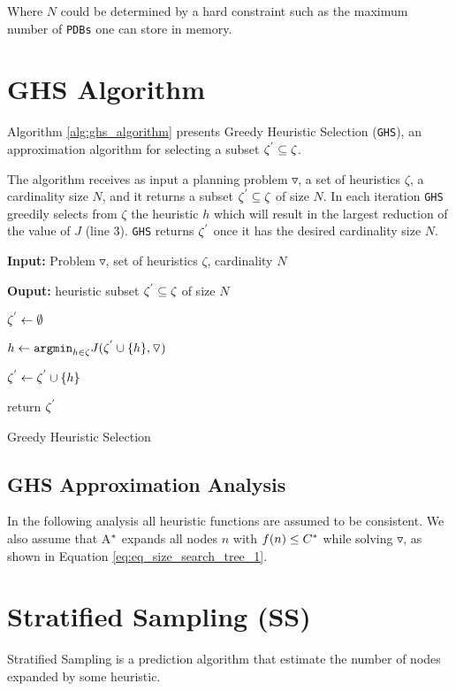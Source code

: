 Where $N$ could be determined by a hard constraint such as the maximum number of \texttt{PDBs} one can store in memory.

\section{GHS Algorithm}
\noindent
Algorithm \ref{alg:ghs_algorithm} presents Greedy Heuristic Selection (\texttt{GHS}), an approximation algorithm for selecting a subset $\zeta\sp{'} \subseteq \zeta$.

The algorithm receives as input a planning problem $\triangledown$, a set of heuristics $\zeta$, a cardinality size $N$, and it returns a subset $\zeta\sp{'} \subseteq \zeta$ of size $N$. In each iteration \texttt{GHS} greedily selects from $\zeta$ the heuristic $h$ which will result in the largest reduction of the value of $J$ (line 3). \texttt{GHS} returns $\zeta\sp{'}$ once it has the desired cardinality size $N$.\\

\begin{algorithm}[H]
 
\textbf{Input:} Problem $\triangledown$, set  of heuristics $\zeta$, cardinality $N$
 
\textbf{Ouput:} heuristic subset $\zeta\sp{'} \subseteq \zeta$ of size $N$
 
$\zeta\sp{'} \leftarrow \emptyset$
 
 {
 
	$h \leftarrow \texttt{argmin}_{h \in \zeta} J(\zeta\sp{'} \cup \{h\}, \triangledown) $
 
	$\zeta\sp{'} \leftarrow \zeta\sp{'} \cup \{h\}$
 
	return $\zeta\sp{'}$
}
\caption{Greedy Heuristic Selection}
\label{alg:ghs_algorithm}
\end{algorithm}

\subsection{GHS Approximation Analysis}
In the following analysis all heuristic functions are assumed to be consistent. We also assume that A$\sp{*}$ expands all nodes $n$ with $f(n) \leq C\sp{*}$ while solving $\triangledown$, as shown in Equation \eqref{eq:eq_size_search_tree_1}.

\section{Stratified Sampling (SS)}
Stratified Sampling is a prediction algorithm that estimate the number of nodes expanded by some heuristic.\\

